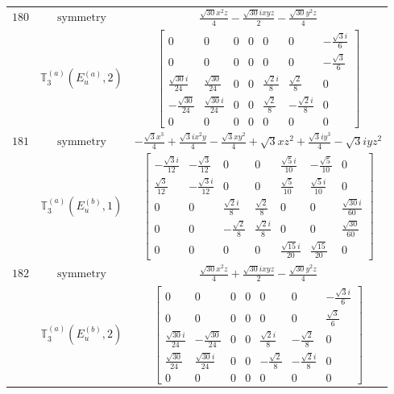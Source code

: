 \documentclass[fleqn,8pt,landscape]{jsarticle}
\begin{document}
\begin{longtable}{ccc}
$ 180 $ & $ \text{symmetry} $ & $ \frac{\sqrt{30} x^{2} z}{4} - \frac{\sqrt{30} i x y z}{2} - \frac{\sqrt{30} y^{2} z}{4} $ \\
$  $ & $ \mathbb{T}_{3}^{(a)}(E_{u}^{(a)},2) $ & $ \begin{bmatrix} 0 & 0 & 0 & 0 & 0 & 0 & - \frac{\sqrt{3} i}{6} \\ 0 & 0 & 0 & 0 & 0 & 0 & - \frac{\sqrt{3}}{6} \\ \frac{\sqrt{30} i}{24} & \frac{\sqrt{30}}{24} & 0 & 0 & \frac{\sqrt{2} i}{8} & \frac{\sqrt{2}}{8} & 0 \\ - \frac{\sqrt{30}}{24} & \frac{\sqrt{30} i}{24} & 0 & 0 & \frac{\sqrt{2}}{8} & - \frac{\sqrt{2} i}{8} & 0 \\ 0 & 0 & 0 & 0 & 0 & 0 & 0 \end{bmatrix} $ \\ \hline
$ 181 $ & $ \text{symmetry} $ & $ - \frac{\sqrt{3} x^{3}}{4} + \frac{\sqrt{3} i x^{2} y}{4} - \frac{\sqrt{3} x y^{2}}{4} + \sqrt{3} x z^{2} + \frac{\sqrt{3} i y^{3}}{4} - \sqrt{3} i y z^{2} $ \\
$  $ & $ \mathbb{T}_{3}^{(a)}(E_{u}^{(b)},1) $ & $ \begin{bmatrix} - \frac{\sqrt{3} i}{12} & - \frac{\sqrt{3}}{12} & 0 & 0 & \frac{\sqrt{5} i}{10} & - \frac{\sqrt{5}}{10} & 0 \\ \frac{\sqrt{3}}{12} & - \frac{\sqrt{3} i}{12} & 0 & 0 & \frac{\sqrt{5}}{10} & \frac{\sqrt{5} i}{10} & 0 \\ 0 & 0 & \frac{\sqrt{2} i}{8} & \frac{\sqrt{2}}{8} & 0 & 0 & \frac{\sqrt{30} i}{60} \\ 0 & 0 & - \frac{\sqrt{2}}{8} & \frac{\sqrt{2} i}{8} & 0 & 0 & \frac{\sqrt{30}}{60} \\ 0 & 0 & 0 & 0 & \frac{\sqrt{15} i}{20} & \frac{\sqrt{15}}{20} & 0 \end{bmatrix} $ \\ \hline
$ 182 $ & $ \text{symmetry} $ & $ \frac{\sqrt{30} x^{2} z}{4} + \frac{\sqrt{30} i x y z}{2} - \frac{\sqrt{30} y^{2} z}{4} $ \\
$  $ & $ \mathbb{T}_{3}^{(a)}(E_{u}^{(b)},2) $ & $ \begin{bmatrix} 0 & 0 & 0 & 0 & 0 & 0 & - \frac{\sqrt{3} i}{6} \\ 0 & 0 & 0 & 0 & 0 & 0 & \frac{\sqrt{3}}{6} \\ \frac{\sqrt{30} i}{24} & - \frac{\sqrt{30}}{24} & 0 & 0 & \frac{\sqrt{2} i}{8} & - \frac{\sqrt{2}}{8} & 0 \\ \frac{\sqrt{30}}{24} & \frac{\sqrt{30} i}{24} & 0 & 0 & - \frac{\sqrt{2}}{8} & - \frac{\sqrt{2} i}{8} & 0 \\ 0 & 0 & 0 & 0 & 0 & 0 & 0 \end{bmatrix} $ \\ \hline

\end{longtable}
\end{document}
